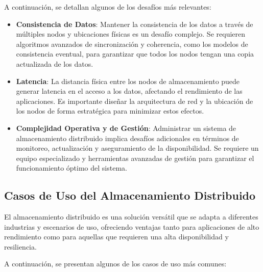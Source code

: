 {            A continuación, se detallan algunos de los desafíos más relevantes:
            
            \begin{itemize}
                \item \textbf{Consistencia de Datos}: Mantener la consistencia de los datos a través de múltiples nodos y ubicaciones físicas es un desafío complejo. Se requieren algoritmos avanzados de sincronización y coherencia, como los modelos de consistencia eventual, para garantizar que todos los nodos tengan una copia actualizada de los datos.
                \item \textbf{Latencia}: La distancia física entre los nodos de almacenamiento puede generar latencia en el acceso a los datos, afectando el rendimiento de las aplicaciones. Es importante diseñar la arquitectura de red y la ubicación de los nodos de forma estratégica para minimizar estos efectos.
                \item \textbf{Complejidad Operativa y de Gestión}: Administrar un sistema de almacenamiento distribuido implica desafíos adicionales en términos de monitoreo, actualización y aseguramiento de la disponibilidad. Se requiere un equipo especializado y herramientas avanzadas de gestión para garantizar el funcionamiento óptimo del sistema.
            \end{itemize}
            
        \subsection{Casos de Uso del Almacenamiento Distribuido}
            El almacenamiento distribuido es una solución versátil que se adapta a diferentes industrias y escenarios de uso, ofreciendo ventajas tanto para aplicaciones de alto rendimiento como para aquellas que requieren una alta disponibilidad y resiliencia.
            
            A continuación, se presentan algunos de los casos de uso más comunes:
            
}

